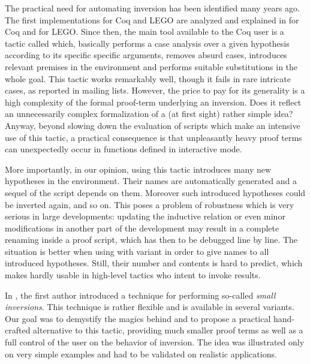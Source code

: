 \medskip
The practical need for automating inversion has been identified
many years ago.
The first implementations for Coq and LEGO
are analyzed and explained in
\cite{cornes95automating} for Coq
and \cite{McBride96} for LEGO.
Since then, the main tool available to the Coq user is
a tactic called \inversion which,
basically performs a case analysis over a given hypothesis
according to its specific specific arguments,
removes absurd cases,
introduces relevant premises in the environment
and performs suitable substitutions in the whole goal.
%
This tactic works remarkably well,
though it fails in rare intricate cases,
as reported in mailing lists. 
%
However, the price to pay for its generality
is a high complexity of the formal proof-term underlying
an inversion. 
Does it reflect an unnecessarily complex formalization of a 
(at first sight) rather simple idea?
Anyway, 
beyond slowing down the evaluation of scripts which make
an intensive use of this tactic, 
a practical consequence is that
unpleasantly heavy proof terms can unexpectedly occur in
functions defined in interactive mode.

More importantly, in our opinion, using this tactic
introduces many new hypotheses in the environment.
Their names are automatically generated
and a sequel of the script depends on them.
Moreover such introduced hypotheses could be inverted again,
and so on.
This poses a problem of robustness which is very serious
in large developments:
updating the inductive relation or
even minor modifications in another part of the development
may result in a complete renaming 
inside a proof script,
which has then to be debugged line by line.
The situation is better when using \inversion with variant in order to
give names to all introduced hypotheses.
Still, their number and contents is hard to predict,
which makes \inversion hardly usable in high-level tactics who intent to
invoke \inversion results.

In \cite{small_inv}, 
the first author introduced a technique 
for performing
so-called \emph{small inversions}. 
This technique is rather flexible and is available in several variants.
Our goal was to demystify the magics behind \inversion
and to propose a practical hand-crafted alternative
to this tactic, 
providing much smaller proof terms as well as
a full control of the user on the behavior of inversion.
The idea was illustrated only on very simple examples
and had to be validated on realistic applications. 

